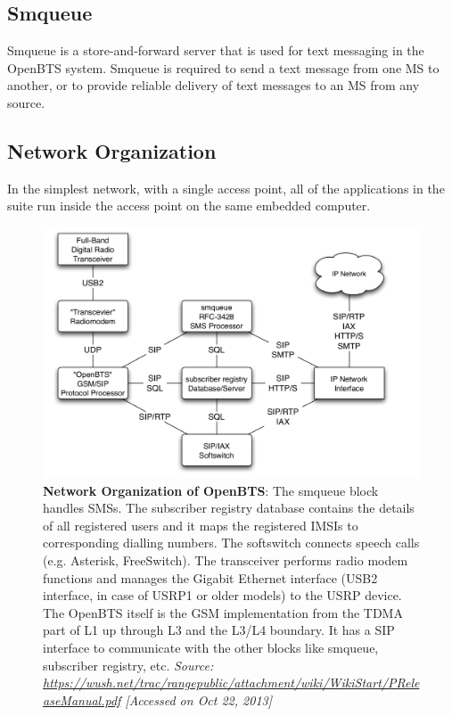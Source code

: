 \subsection{Smqueue}
Smqueue is a store-and-forward server that is used for text messaging in the OpenBTS system. Smqueue is required to send a text message from one MS to another, or to provide reliable delivery of text messages to an MS from any source.

\subsection{Network Organization}
In the simplest network, with a single access point, all of the applications in the suite run inside the access point on the same embedded computer.



\begin{figure}[h]
\centering
\includegraphics[width=1\textwidth]{networkOrg}
\caption[Network Organization of OpenBTS]{\textbf{Network Organization of OpenBTS}: The smqueue block handles SMSs. 
The subscriber registry database contains the details of all registered users and it
maps the registered IMSIs to corresponding dialling numbers. The softswitch connects 
speech calls (e.g. Asterisk, FreeSwitch). The transceiver performs radio modem
functions and manages the Gigabit Ethernet interface (USB2 interface, in case
of USRP1 or older models) to the USRP device. The OpenBTS itself is the GSM 
implementation from the TDMA part of L1 up through L3 and the L3/L4 boundary. 
It has a SIP interface to communicate with the other blocks like smqueue, subscriber 
registry, etc. \emph{Source: \url{https://wush.net/trac/rangepublic/attachment/wiki/WikiStart/PReleaseManual.pdf} [Accessed on Oct 22, 2013]}
}
\label{networkOrg}
\end{figure}




















